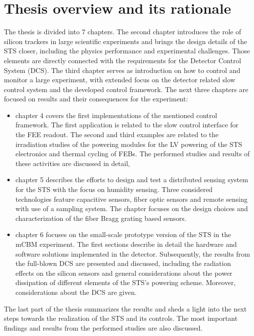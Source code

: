 \section{Thesis overview and its rationale}
The thesis is divided into 7 chapters. The second chapter introduces the role of silicon trackers in large scientific experiments and brings the design details of the \gls{STS} closer, including the physics performance and experimental challenges. Those elements are directly connected with the requirements for the Detector Control System (\gls{DCS}). The third chapter serves as introduction on how to control and monitor a large experiment, with extended focus on the detector related slow control system and the developed control framework. The next three chapters are focused on results and their consequences for the experiment:
\begin{itemize}
    \item chapter 4 covers the first implementations of the mentioned control framework. The first application is related to the slow control interface for the \gls{FEE} readout. The second and third examples are related to the irradiation studies of the powering modules for the \gls{LV} powering of the \gls{STS} electronics and thermal cycling of \glspl{FEB}. The performed studies and results of these activities are discussed in detail,
    \item chapter 5 describes the efforts to design and test a distributed sensing system for the \gls{STS} with the focus on humidity sensing. Three considered technologies feature capacitive sensors, fiber optic sensors and remote sensing with use of a sampling system. The chapter focuses on the design choices and characterization of the fiber Bragg grating based sensors. 
    \item chapter 6 focuses on the small-scale prototype version of the \gls{STS} in the \gls{mCBM} experiment. The first sections describe in detail the hardware and software solutions implemented in the detector. Subsequently, the results from the full-blown \gls{DCS} are presented and discussed, including the radiation effects on the silicon sensors and general considerations about the power dissipation of different elements of the \gls{STS}'s powering scheme. Moreover, considerations about the \gls{DCS} are given. 
\end{itemize}
The last part of the thesis summarizes the results and sheds a light into the next steps towards the realization of the \gls{STS} and its controls. The most important findings and results from the performed studies are also discussed.